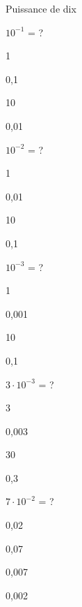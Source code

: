 \documentclass[12pt]{article}
\begin{document}
\begin{quiz}{Puissance de dix}
\begin{multi}[points=1]{}
$10^{-1}$ = ?
\item 1
\item   * 0,1
\item  10
\item  0,01
\end{multi}

\begin{multi}[points=1]{}
$10^{-2}$ = ?
\item 1
\item   * 0,01
\item  10
\item  0,1
\end{multi}

\begin{multi}[points=1]{}
$10^{-3}$ = ?
\item 1
\item   * 0,001
\item  10
\item  0,1
\end{multi}

\begin{multi}[points=1]{}
$3 \cdot 10^{-3}$ = ?
\item 3
\item   * 0,003
\item  30
\item  0,3
\end{multi}

\begin{multi}[points=1]{}
$7 \cdot 10^{-2}$ = ?
\item 0,02
\item   * 0,07
\item  0,007
\item  0,002
\end{multi}

\end{quiz}
\end{document}
